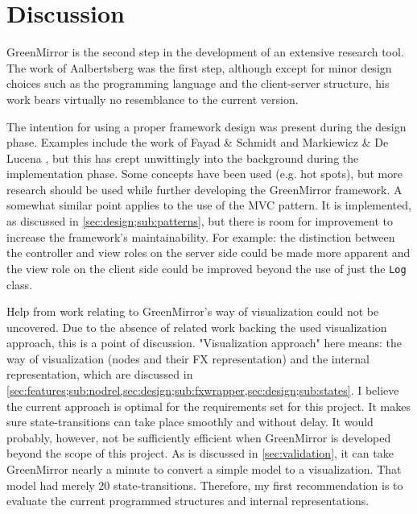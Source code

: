 \section{Discussion}\label{sec:discussion}
GreenMirror is the second step in the development of an extensive research tool. The work of Aalbertsberg \cite{aalbertsberg2015} was the first step, although except for minor design choices such as the programming language and the client-server structure, his work bears virtually no resemblance to the current version. 

The intention for using a proper framework design was present during the design phase. Examples include the work of Fayad \& Schmidt \cite{fayad1997} and Markiewicz \& De Lucena \cite{markiewicz2001}, but this has crept unwittingly into the background during the implementation phase. Some concepts have been used (e.g. hot spots), but more research should be used while further developing the GreenMirror framework. A somewhat similar point applies to the use of the MVC pattern. It is implemented, as discussed in \cref{sec:design;sub:patterns}, but there is room for improvement to increase the framework's maintainability. For example: the distinction between the controller and view roles on the server side could be made more apparent and the view role on the client side could be improved beyond the use of just the \lstinline{Log} class.

Help from work relating to GreenMirror's way of visualization could not be uncovered. Due to the absence of related work backing the used visualization approach, this is a point of discussion. "Visualization approach" here means: the way of visualization (nodes and their FX representation) and the internal representation, which are discussed in \cref{sec:features;sub:nodrel,sec:design;sub:fxwrapper,sec:design;sub:states}. I believe the current approach is optimal for the requirements set for this project. It makes sure state-transitions can take place smoothly and without delay. It would probably, however, not be sufficiently efficient when GreenMirror is developed beyond the scope of this project. As is discussed in \cref{sec:validation}, it can take GreenMirror nearly a minute to convert a simple model to a visualization. That model had merely 20 state-transitions. Therefore, my first recommendation is to evaluate the current programmed structures and internal representations.

